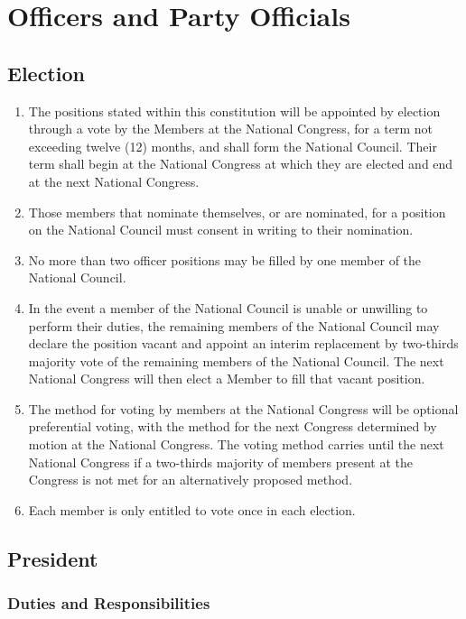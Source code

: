 \documentclass[a4paper,titlepage,8.5pt]{article}
\begin{document}
\section{Officers and Party Officials}

\subsection{Election}

\begin{enumerate}
\item The positions stated within this constitution will be appointed by election through a vote by the Members at the National Congress, for a term not exceeding twelve (12) months, and shall form the National Council. Their term shall begin at the National Congress at which they are elected and end at the next National Congress.
\item Those members that nominate themselves, or are nominated, for a position on the National Council must consent in writing to their nomination.
\item No more than two officer positions may be filled by one member of the National Council.
\item In the event a member of the National Council is unable or unwilling to perform their duties, the remaining members of the National Council may declare the position vacant and appoint an interim replacement by two-thirds majority vote of the remaining members of the National Council. The next National Congress will then elect a Member to fill that vacant position.
\item The method for voting by members at the National Congress will be optional preferential voting, with the method for the next Congress determined by motion at the National Congress. The voting method carries until the next National Congress if a two-thirds majority of members present at the Congress is not met for an alternatively proposed method.
\item Each member is only entitled to vote once in each election.
\end{enumerate}

\subsection{President}

\subsubsection{Duties and Responsibilities}
\end{document}
